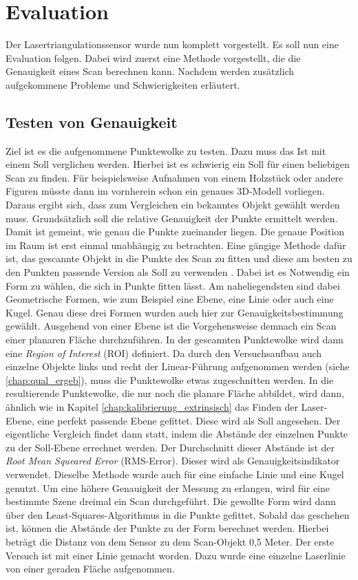 \section{Evaluation}
		
		Der Lasertriangulationssensor wurde nun komplett vorgestellt. Es soll nun eine Evaluation folgen. Dabei wird zuerst eine Methode vorgestellt, die die Genauigkeit eines Scan berechnen kann. Nachdem werden zusätzlich aufgekommene Probleme und Schwierigkeiten erläutert.   
		\subsection{Testen von Genauigkeit}
		Ziel ist es die aufgenommene Punktewolke zu testen. Dazu muss das \glqq Ist\grqq{} mit einem \glqq Soll\grqq{} verglichen werden. Hierbei ist es schwierig ein \glqq Soll\grqq{} für einen beliebigen Scan zu finden. Für beispielsweise Aufnahmen von einem Holzstück oder andere Figuren müsste dann im vornherein schon ein genaues 3D-Modell vorliegen. Daraus ergibt sich, dass zum Vergleichen ein bekanntes Objekt gewählt werden muss. Grundsätzlich soll die relative Genauigkeit der Punkte ermittelt werden. Damit ist gemeint, wie genau die Punkte zueinander liegen. Die genaue Position im Raum ist erst einmal unabhängig zu betrachten. Eine gängige Methode dafür ist, das gescannte Objekt in die Punkte des Scan zu fitten und diese am besten zu den Punkten passende Version als \glqq Soll\grqq{} zu verwenden \citep{bart_accuracy_nodate} \citep{song_multi-view_2019}. Dabei ist es Notwendig ein Form zu wählen, die sich in Punkte fitten lässt. Am naheliegendsten sind dabei Geometrische Formen, wie zum Beispiel eine Ebene, eine Linie oder auch eine Kugel. Genau diese drei Formen wurden auch hier zur Genauigkeitsbestimmung gewählt. Ausgehend von einer Ebene ist die  Vorgehensweise demnach ein Scan einer planaren Fläche durchzuführen. In der gescannten Punktewolke wird dann eine \textit{Region of Interest} (ROI) definiert. Da durch den Versuchsaufbau auch einzelne Objekte links und recht der Linear-Führung aufgenommen werden (siehe \ref{chap:qual_ergeb}), muss die Punktewolke etwas zugeschnitten werden. In die resultierende Punktewolke, die nur noch die planare Fläche abbildet, wird dann, ähnlich wie in Kapitel \ref{chap:kalibrierung_extrinsisch} das Finden der Laser-Ebene, eine perfekt passende Ebene gefittet. Diese wird als \glqq Soll\grqq{} angesehen. Der eigentliche Vergleich findet dann statt, indem die Abstände der einzelnen Punkte zu der \glqq Soll\grqq-Ebene errechnet werden. Der Durchschnitt dieser Abstände ist der \textit{Root Mean Squeared Error} (RMS-Error). Dieser wird als Genauigkeitsindikator verwendet. Dieselbe Methode wurde auch für eine einfache Linie und eine Kugel genutzt. Um eine höhere Genauigkeit der Messung zu erlangen, wird für eine bestimmte Szene dreimal ein Scan durchgeführt. Die gewollte Form wird dann über den Least-Squares-Algorithmus in die Punkte gefittet. Sobald das geschehen ist, können die Abstände der Punkte zu der Form berechnet werden. Hierbei beträgt die Distanz von dem Sensor zu dem Scan-Objekt 0,5 Meter. \newline
		Der erste Versuch ist mit einer Linie gemacht worden. Dazu wurde eine einzelne Laserlinie von einer geraden Fläche aufgenommen.  
		
